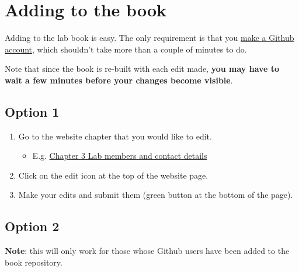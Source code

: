 \documentclass[]{book}
\providecommand{\tightlist}{%
  \setlength{\itemsep}{0pt}\setlength{\parskip}{0pt}}
\begin{document}
\section{Adding to the book}\label{adding-to-the-book}

Adding to the lab book is easy. The only requirement is that you
\href{https://github.com/join?source=header-home}{make a Github
account}, which shouldn't take more than a couple of minutes to do.

Note that since the book is re-built with each edit made, \textbf{you
may have to wait a few minutes before your changes become visible}.

\subsection{Option 1}\label{option-1}

\begin{enumerate}
\def\labelenumi{\arabic{enumi}.}
\tightlist
\item
  Go to the website chapter that you would like to edit.

  \begin{itemize}
  \tightlist
  \item
    E.g.
    \href{https://tiroshlab.github.io/lab-book/contact.html}{Chapter 3
    Lab members and contact details}
  \end{itemize}
\item
  Click on the edit icon at the top of the website page.
\item
  Make your edits and submit them (green button at the bottom of the
  page).
\end{enumerate}

\subsection{Option 2}\label{option-2}

\textbf{Note}: this will only work for those whose Github users have
been added to the book repository.
\end{document}
